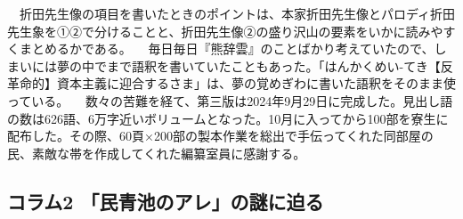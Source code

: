 　折田先生像の項目を書いたときのポイントは、本家折田先生像とパロディ折田先生象を①②で分けることと、折田先生像②の盛り沢山の要素をいかに読みやすくまとめるかである。
　毎日毎日『熊辞雲』のことばかり考えていたので、しまいには夢の中でまで語釈を書いていたこともあった。「はんかくめい-てき【反革命的】資本主義に迎合するさま」は、夢の覚めぎわに書いた語釈をそのまま使っている。
　数々の苦難を経て、第三版は2024年9月29日に完成した。見出し語の数は626語、6万字近いボリュームとなった。10月に入ってから100部を寮生に配布した。その際、60頁×200部の製本作業を総出で手伝ってくれた同部屋の民、素敵な帯を作成してくれた編纂室員に感謝する。


\subsection{コラム2 「民青池のアレ」の謎に迫る}


